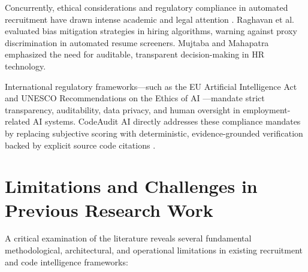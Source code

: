 Concurrently, ethical considerations and regulatory compliance in automated recruitment have drawn intense academic and legal attention \cite{ref4, ref14, ref22, ref65, ref66}. Raghavan et al. \cite{ref22} evaluated bias mitigation strategies in hiring algorithms, warning against proxy discrimination in automated resume screeners. Mujtaba and Mahapatra \cite{ref14} emphasized the need for auditable, transparent decision-making in HR technology.

International regulatory frameworks—such as the EU Artificial Intelligence Act \cite{ref65} and UNESCO Recommendations on the Ethics of AI \cite{ref66}—mandate strict transparency, auditability, data privacy, and human oversight in employment-related AI systems. CodeAudit AI directly addresses these compliance mandates by replacing subjective scoring with deterministic, evidence-grounded verification backed by explicit source code citations \cite{ref2, ref65, ref66}.

\section{Limitations and Challenges in Previous Research Work}

A critical examination of the literature reveals several fundamental methodological, architectural, and operational limitations in existing recruitment and code intelligence frameworks:

